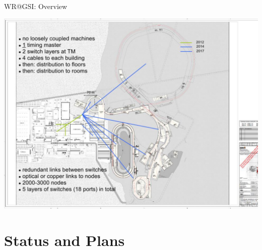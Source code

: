 \documentclass[compress,red]{beamer}
\begin{document}
\begin{frame}{WR@GSI: Overview}


      \begin{center}
	\includegraphics[scale=0.30]{applications/gmt-at--fair_ppt.pdf}
      \end{center}  

\end{frame}



\section{Status and Plans}
\end{document}

